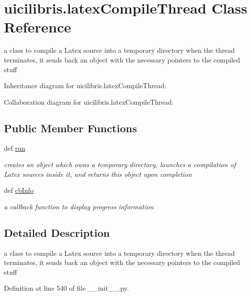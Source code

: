 \hypertarget{classuicilibris_1_1latexCompileThread}{\section{uicilibris.\-latex\-Compile\-Thread \-Class \-Reference}
\label{classuicilibris_1_1latexCompileThread}
}


a class to compile a \-Latex source into a temporary directory when the thread terminates, it sends back an object with the necessary pointers to the compiled stuff  




\-Inheritance diagram for uicilibris.\-latex\-Compile\-Thread\-:


\-Collaboration diagram for uicilibris.\-latex\-Compile\-Thread\-:
\subsection*{\-Public \-Member \-Functions}
\begin{DoxyCompactItemize}
\item 
def \hyperlink{classuicilibris_1_1latexCompileThread_a96c9b7bd10cb6c01422d7f1c11f7b3e1}{run}
\begin{DoxyCompactList}\small\item\em creates an object which owns a temporary directory, launches a compilation of \-Latex sources inside it, and returns this object upon completion \end{DoxyCompactList}\item 
def \hyperlink{classuicilibris_1_1latexCompileThread_af1ca34e7c4db9ef4eabb1c3d660fa032}{cb\-Info}
\begin{DoxyCompactList}\small\item\em a callback function to display progress information \end{DoxyCompactList}\end{DoxyCompactItemize}


\subsection{\-Detailed \-Description}
a class to compile a \-Latex source into a temporary directory when the thread terminates, it sends back an object with the necessary pointers to the compiled stuff 

\-Definition at line 540 of file \-\_\-\-\_\-init\-\_\-\-\_\-.\-py.




